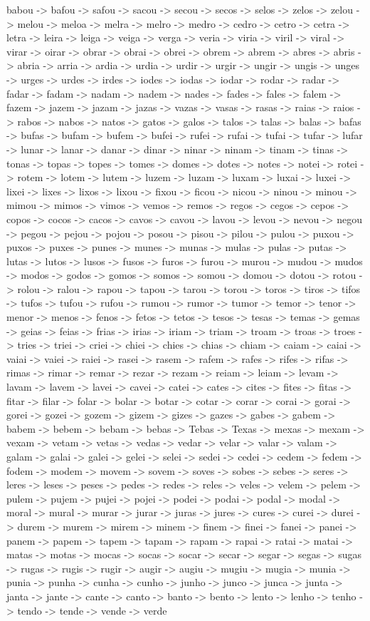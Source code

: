 \documentclass[a4paper,11pt]{article}
\begin{document}
babou -> bafou -> safou -> sacou -> secou -> secos -> selos -> zelos -> zelou -> melou -> meloa -> melra -> melro -> medro -> cedro -> cetro -> cetra -> letra -> leira -> leiga -> veiga -> verga -> veria -> viria -> viril -> viral -> virar -> oirar -> obrar -> obrai -> obrei -> obrem -> abrem -> abres -> abris -> abria -> arria -> ardia -> urdia -> urdir -> urgir -> ungir -> ungis -> unges -> urges -> urdes -> irdes -> iodes -> iodas -> iodar -> rodar -> radar -> fadar -> fadam -> nadam -> nadem -> nades -> fades -> fales -> falem -> fazem -> jazem -> jazam -> jazas -> vazas -> vasas -> rasas -> raias -> raios -> rabos -> nabos -> natos -> gatos -> galos -> talos -> talas -> balas -> bafas -> bufas -> bufam -> bufem -> bufei -> rufei -> rufai -> tufai -> tufar -> lufar -> lunar -> lanar -> danar -> dinar -> ninar -> ninam -> tinam -> tinas -> tonas -> topas -> topes -> tomes -> domes -> dotes -> notes -> notei -> rotei -> rotem -> lotem -> lutem -> luzem -> luzam -> luxam -> luxai -> luxei -> lixei -> lixes -> lixos -> lixou -> fixou -> ficou -> nicou -> ninou -> minou -> mimou -> mimos -> vimos -> vemos -> remos -> regos -> cegos -> cepos -> copos -> cocos -> cacos -> cavos -> cavou -> lavou -> levou -> nevou -> negou -> pegou -> pejou -> pojou -> posou -> pisou -> pilou -> pulou -> puxou -> puxos -> puxes -> punes -> munes -> munas -> mulas -> pulas -> putas -> lutas -> lutos -> lusos -> fusos -> furos -> furou -> murou -> mudou -> mudos -> modos -> godos -> gomos -> somos -> somou -> domou -> dotou -> rotou -> rolou -> ralou -> rapou -> tapou -> tarou -> torou -> toros -> tiros -> tifos -> tufos -> tufou -> rufou -> rumou -> rumor -> tumor -> temor -> tenor -> menor -> menos -> fenos -> fetos -> tetos -> tesos -> tesas -> temas -> gemas -> geias -> feias -> frias -> irias -> iriam -> triam -> troam -> troas -> troes -> tries -> triei -> criei -> chiei -> chies -> chias -> chiam -> caiam -> caiai -> vaiai -> vaiei -> raiei -> rasei -> rasem -> rafem -> rafes -> rifes -> rifas -> rimas -> rimar -> remar -> rezar -> rezam -> reiam -> leiam -> levam -> lavam -> lavem -> lavei -> cavei -> catei -> cates -> cites -> fites -> fitas -> fitar -> filar -> folar -> bolar -> botar -> cotar -> corar -> corai -> gorai -> gorei -> gozei -> gozem -> gizem -> gizes -> gazes -> gabes -> gabem -> babem -> bebem -> bebam -> bebas -> Tebas -> Texas -> mexas -> mexam -> vexam -> vetam -> vetas -> vedas -> vedar -> velar -> valar -> valam -> galam -> galai -> galei -> gelei -> selei -> sedei -> cedei -> cedem -> fedem -> fodem -> modem -> movem -> sovem -> soves -> sobes -> sebes -> seres -> leres -> leses -> peses -> pedes -> redes -> reles -> veles -> velem -> pelem -> pulem -> pujem -> pujei -> pojei -> podei -> podai -> podal -> modal -> moral -> mural -> murar -> jurar -> juras -> jures -> cures -> curei -> durei -> durem -> murem -> mirem -> minem -> finem -> finei -> fanei -> panei -> panem -> papem -> tapem -> tapam -> rapam -> rapai -> ratai -> matai -> matas -> motas -> mocas -> socas -> socar -> secar -> segar -> segas -> sugas -> rugas -> rugis -> rugir -> augir -> augiu -> mugiu -> mugia -> munia -> punia -> punha -> cunha -> cunho -> junho -> junco -> junca -> junta -> janta -> jante -> cante -> canto -> banto -> bento -> lento -> lenho -> tenho -> tendo -> tende -> vende -> verde 
\end{document}

